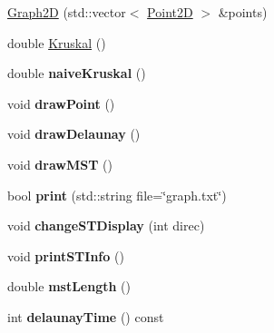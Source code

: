 \begin{DoxyCompactItemize}
\item 
\hyperlink{classcmst_1_1_graph2_d_a36cf583f9e2e59da2bed94c8569914d2}{Graph2D} (std\+::vector$<$ \hyperlink{classcmst_1_1_point2_d}{Point2D} $>$ \&points)
\item 
double \hyperlink{classcmst_1_1_graph2_d_a034d2d37b2d106c0e25d7ad7bc67907e}{Kruskal} ()
\item 
double {\bfseries naive\+Kruskal} ()\hypertarget{classcmst_1_1_graph2_d_af0db14845e80799be1d4fb15ca230110}{}\label{classcmst_1_1_graph2_d_af0db14845e80799be1d4fb15ca230110}

\item 
void {\bfseries draw\+Point} ()\hypertarget{classcmst_1_1_graph2_d_affec250ee22a067a28127b46ce976b90}{}\label{classcmst_1_1_graph2_d_affec250ee22a067a28127b46ce976b90}

\item 
void {\bfseries draw\+Delaunay} ()\hypertarget{classcmst_1_1_graph2_d_a2c4ed2ccd1fffc94c636929e531c4e3e}{}\label{classcmst_1_1_graph2_d_a2c4ed2ccd1fffc94c636929e531c4e3e}

\item 
void {\bfseries draw\+M\+ST} ()\hypertarget{classcmst_1_1_graph2_d_a96e388b819b351c8564eed9aecf58f7d}{}\label{classcmst_1_1_graph2_d_a96e388b819b351c8564eed9aecf58f7d}

\item 
bool {\bfseries print} (std\+::string file=\char`\"{}graph.\+txt\char`\"{})\hypertarget{classcmst_1_1_graph2_d_a0e0bafdd08a942ef01c66768b5021f09}{}\label{classcmst_1_1_graph2_d_a0e0bafdd08a942ef01c66768b5021f09}

\item 
void {\bfseries change\+S\+T\+Display} (int direc)\hypertarget{classcmst_1_1_graph2_d_abb6cf2245d6ac93f5553e28f8723fce5}{}\label{classcmst_1_1_graph2_d_abb6cf2245d6ac93f5553e28f8723fce5}

\item 
void {\bfseries print\+S\+T\+Info} ()\hypertarget{classcmst_1_1_graph2_d_a547a65e56068434928777eb7b4e59510}{}\label{classcmst_1_1_graph2_d_a547a65e56068434928777eb7b4e59510}

\item 
double {\bfseries mst\+Length} ()\hypertarget{classcmst_1_1_graph2_d_aea22c23fdbb3b9e91671562cb19730ed}{}\label{classcmst_1_1_graph2_d_aea22c23fdbb3b9e91671562cb19730ed}

\item 
int {\bfseries delaunay\+Time} () const \hypertarget{classcmst_1_1_graph2_d_a93a1d4d5d2dd08796e37bcba6de79341}{}\label{classcmst_1_1_graph2_d_a93a1d4d5d2dd08796e37bcba6de79341}


\end{DoxyCompactItemize}
